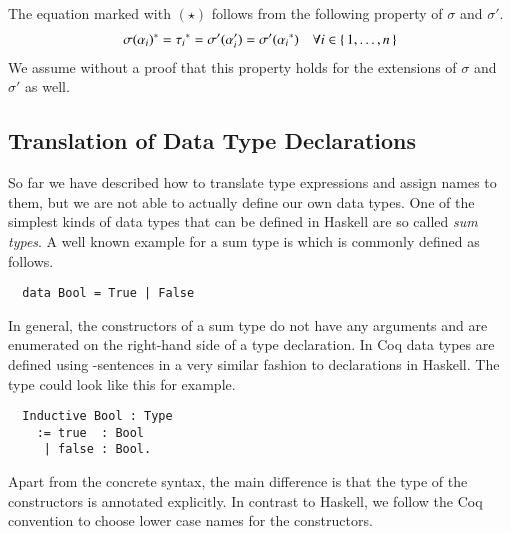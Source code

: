 The equation marked with $(\star)$ follows from the following property of $\sigma$ and $\sigma'$.
\begin{align*}
  {\sigma(\alpha_i)}^{*} = {\tau_i}^{*}
                            = \sigma'(\alpha_i')
                            = \sigma'({\alpha_i}^{*})
  &&\forall i \in \{\, 1, \ldots, n \,\}
\end{align*}
We assume without a proof that this property holds for the extensions of $\sigma$ and $\sigma'$ as well.

\subsection{Translation of Data Type Declarations} \label{sec:translation:type-decl:data}
So far we have described how to translate type expressions and assign names to them, but we are not able to actually define our own data types.
One of the simplest kinds of data types that can be defined in Haskell are so called \textit{sum types}.
A well known example for a sum type is  which is commonly defined as follows.
\begin{verbatim}
  data Bool = True | False
\end{verbatim}
In general, the constructors of a sum type do not have any arguments and are enumerated on the right-hand side of a  type declaration.
In Coq data types are defined using -sentences in a very similar fashion to  declarations in Haskell.
The  type could look like this for example.
\begin{verbatim}
  Inductive Bool : Type
    := true  : Bool
     | false : Bool.
\end{verbatim}
Apart from the concrete syntax, the main difference is that the type of the constructors is annotated explicitly.
In contrast to Haskell, we follow the Coq convention to choose lower case names for the constructors.

